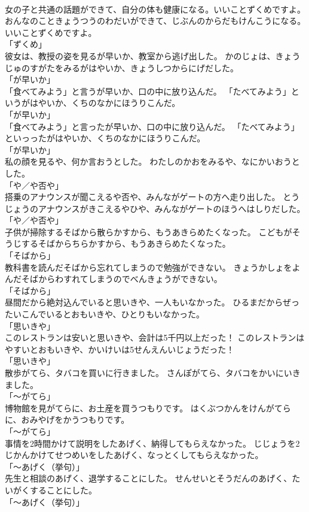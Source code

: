 \documentclass[8pt]{extreport}
\begin{document}
\begin{CJK}{UTF8}{min}
\\	女の子と共通の話題ができて、自分の体も健康になる。いいことずくめですよ。	おんなのこときょうつうのわだいができて、じぶんのからだもけんこうになる。いいことずくめですよ。	
\\	「ずくめ」 
\\	彼女は、教授の姿を見るが早いか、教室から逃げ出した。	かのじょは、きょうじゅのすがたをみるがはやいか、きょうしつからにげだした。	
\\	「が早いか」 
\\	「食べてみよう」と言うが早いか、口の中に放り込んだ。	「たべてみよう」というがはやいか、くちのなかにほうりこんだ。	
\\	「が早いか」 
\\	「食べてみよう」と言ったが早いか、口の中に放り込んだ。	「たべてみよう」といっったがはやいか、くちのなかにほうりこんだ。	
\\	「が早いか」 
\\	私の顔を見るや、何か言おうとした。	わたしのかおをみるや、なにかいおうとした。	
\\	「や／や否や」 
\\	搭乗のアナウンスが聞こえるや否や、みんながゲートの方へ走り出した。	とうじょうのアナウンスがきこえるやひや、みんながゲートのほうへはしりだした。	
\\	「や／や否や」 
\\	子供が掃除するそばから散らかすから、もうあきらめたくなった。	こどもがそうじするそばからちらかすから、もうあきらめたくなった。	
\\	「そばから」 
\\	教科書を読んだそばから忘れてしまうので勉強ができない。	きょうかしょをよんだそばからわすれてしまうのでべんきょうができない。	
\\	「そばから」 
\\	昼間だから絶対込んでいると思いきや、一人もいなかった。	ひるまだからぜったいこんでいるとおもいきや、ひとりもいなかった。	
\\	「思いきや」 
\\	このレストランは安いと思いきや、会計は5千円以上だった！	このレストランはやすいとおもいきや、かいけいは5せんえんいじょうだった！	
\\	「思いきや」 
\\	散歩がてら、タバコを買いに行きました。	さんぽがてら、タバコをかいにいきました。	
\\	「～がてら」 
\\	博物館を見がてらに、お土産を買うつもりです。	はくぶつかんをけんがてらに、おみやげをかうつもりです。	
\\	「～がてら」 
\\	事情を2時間かけて説明をしたあげく、納得してもらえなかった。	じじょうを2じかんかけてせつめいをしたあげく、なっとくしてもらえなかった。	
\\	「～あげく（挙句）」 
\\	先生と相談のあげく、退学することにした。	せんせいとそうだんのあげく、たいがくすることにした。	
\\	「～あげく（挙句）」 
\end{CJK}
\end{document}
